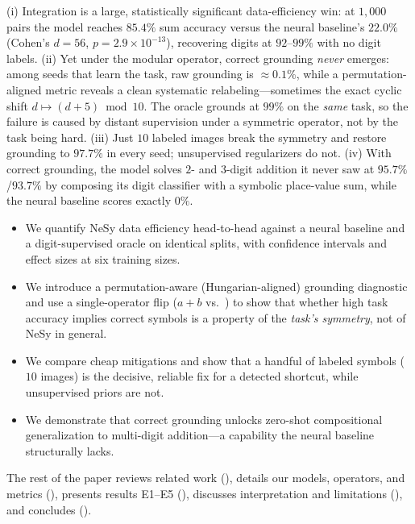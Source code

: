 (i) Integration is a large, statistically significant data-efficiency win:
at $1{,}000$ pairs the \nesy model reaches $85.4\%$ sum accuracy versus the neural baseline's
$22.0\%$ (Cohen's $d{=}56$, $p{=}2.9{\times}10^{-13}$), recovering digits at $92$--$99\%$ with no
digit labels. (ii) Yet under the modular operator, correct grounding \emph{never} emerges: among
seeds that learn the task, raw grounding is $\approx0.1\%$, while a permutation-aligned metric reveals
a clean systematic relabeling---sometimes the exact cyclic shift $d\mapsto(d{+}5)\bmod 10$. The
oracle grounds at $99\%$ on the \emph{same} task, so the failure is caused by distant supervision under
a symmetric operator, not by the task being hard. (iii) Just $10$ labeled images break the symmetry
and restore grounding to $97.7\%$ in every seed; unsupervised regularizers do not. (iv) With correct
grounding, the \nesy model solves $2$- and $3$-digit addition it never saw at $95.7\%$/$93.7\%$ by
composing its digit classifier with a symbolic place-value sum, while the neural baseline scores
exactly $0\%$.

\begin{itemize}[leftmargin=*,itemsep=0pt,topsep=0pt]
    \item We quantify NeSy data efficiency head-to-head against a neural baseline and a digit-supervised
    oracle on identical splits, with confidence intervals and effect sizes at six training sizes.
    \item We introduce a permutation-aware (Hungarian-aligned) grounding diagnostic and use a
    single-operator flip ($a{+}b$ vs.\ \modten) to show that whether high task accuracy implies correct
    symbols is a property of the \emph{task's symmetry}, not of NeSy in general.
    \item We compare cheap mitigations and show that a handful of labeled symbols ($10$ images) is the
    decisive, reliable fix for a detected shortcut, while unsupervised priors are not.
    \item We demonstrate that correct grounding unlocks zero-shot compositional generalization to
    multi-digit addition---a capability the neural baseline structurally lacks.
\end{itemize}

The rest of the paper reviews related work (), details our models, operators, and
metrics (), presents results E1--E5 (), discusses
interpretation and limitations (), and concludes ().
